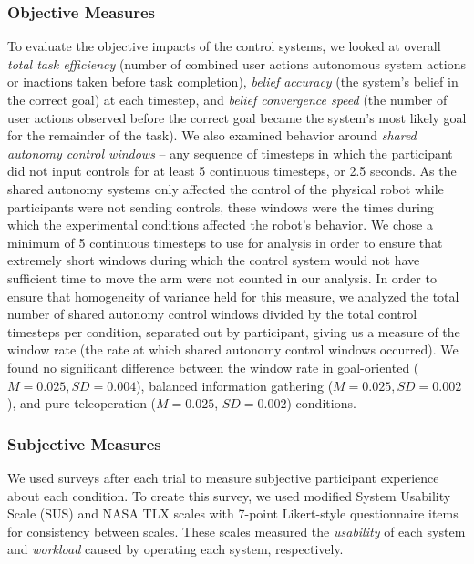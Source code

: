 \documentclass[conference]{IEEEtran}
\begin{document}
\subsubsection{Objective Measures}
To evaluate the objective impacts of the control systems, we looked at overall \textit{total task efficiency} (number of combined user actions autonomous system actions or inactions taken before task completion), \textit{belief accuracy} (the system's belief in the correct goal) at each timestep, and \textit{belief convergence speed} (the number of user actions observed before the correct goal became the system's most likely goal for the remainder of the task). We also examined behavior around \textit{shared autonomy control windows} -- any sequence of timesteps in which the participant did not input controls for at least 5 continuous timesteps, or 2.5 seconds. As the shared autonomy systems only affected the control of the physical robot while participants were not sending controls, these windows were the times during which the experimental conditions affected the robot's behavior. We chose a minimum of 5 continuous timesteps to use for analysis in order to ensure that extremely short windows during which the control system would not have sufficient time to move the arm were not counted in our analysis. In order to ensure that homogeneity of variance held for this measure, we analyzed the total number of shared autonomy control windows divided by the total control timesteps per condition, separated out by participant, giving us a measure of the window rate (the rate at which shared autonomy control windows occurred). We found no significant difference between the window rate in goal-oriented ($M = 0.025, SD = 0.004$), balanced information gathering ($M = 0.025, SD = 0.002$), and pure teleoperation ($M = 0.025$, $SD = 0.002$) conditions.

\subsubsection{Subjective Measures}

We used surveys after each trial to measure subjective participant experience about each condition. To create this survey, we used modified System Usability Scale (SUS) and NASA TLX scales with 7-point Likert-style questionnaire items for consistency between scales. These scales measured the \textit{usability} of each system and \textit{workload} caused by operating each system, respectively.

%
%
\end{document}
